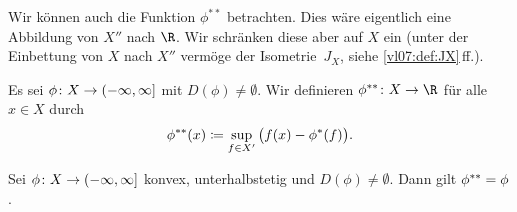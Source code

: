 \medskip
%
Wir können auch die Funktion $\phi^{\ast\ast}$ betrachten.
Dies wäre eigentlich eine Abbildung von $X''$ nach $\R$. Wir schränken diese aber
auf $X$ ein (unter der Einbettung von $X$ nach $X''$ vermöge der
Isometrie~$J_X$, siehe \cref{vl07:def:JX}\,ff.).

\begin{thDef}
    Es sei $\phi\colon X\to(-\infty,\infty]$ mit $D(\phi)\neq\emptyset$.
    Wir definieren $\phi^\dast\colon X\to\R$ für alle $x\in X$ durch
    \[ \phi^{\ast\ast}(x) \coloneqq \sup_{f\in X'} \, \bigl( f(x) - \phi^\ast(f)
        \bigr)
    . \]
\end{thDef}

\begin{thTheorem} \label{vl08:fenchelmoreau}
    Sei $\phi\colon X\to(-\infty,\infty]$ konvex, unterhalbstetig und
    $D(\phi)\neq\emptyset$. Dann gilt $\phi^{\ast\ast} = \phi$.
\end{thTheorem}

